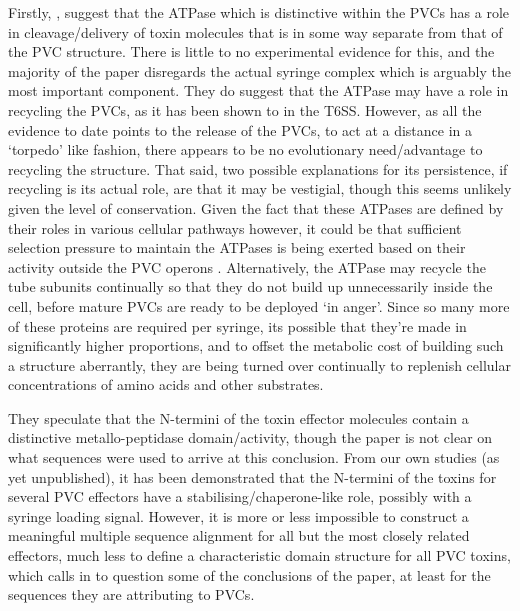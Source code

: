 Firstly, \cite{Zhang2012a}, suggest that the ATPase which is distinctive within the PVCs has a role in cleavage/delivery of toxin molecules that is in some way separate from that of the PVC structure. There is little to no experimental evidence for this, and the majority of the paper disregards the actual syringe complex which is arguably the most important component. They do suggest that the ATPase may have a role in recycling the PVCs, as it has been shown to in the T6SS. However, as all the evidence to date points to the release of the PVCs, to act at a distance in a `torpedo' like fashion, there appears to be no evolutionary need/advantage to recycling the structure. That said, two possible explanations for its persistence, if recycling is its actual role, are that it may be vestigial, though this seems unlikely given the level of conservation. Given the fact that these ATPases are defined by their roles in various cellular pathways however, it could be that sufficient selection pressure to maintain the ATPases is being exerted based on their activity outside the PVC operons \citep{Iyer2004}. Alternatively, the ATPase may recycle the tube subunits continually so that they do not build up unnecessarily inside the cell, before mature PVCs are ready to be deployed `in anger'. Since so many more of these proteins are required per syringe, its possible that they're made in significantly higher proportions, and to offset the metabolic cost of building such a structure aberrantly, they are being turned over continually to replenish cellular concentrations of amino acids and other substrates.

They speculate that the N-termini of the toxin effector molecules contain a distinctive metallo-peptidase domain/activity, though the paper is not clear on what sequences were used to arrive at this conclusion. From our own studies (as yet unpublished), it has been demonstrated that the N-termini of the toxins for several PVC effectors have a stabilising/chaperone-like role, possibly with a syringe loading signal. However, it is more or less impossible to construct a meaningful multiple sequence alignment for all but the most closely related effectors, much less to define a characteristic domain structure for all PVC toxins, which calls in to question some of the conclusions of the paper, at least for the sequences they are attributing to PVCs.

